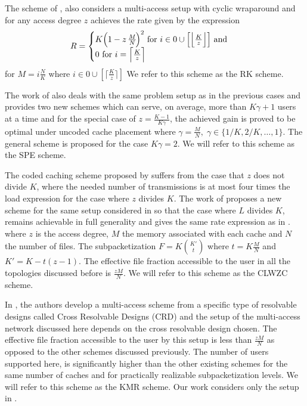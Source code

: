 \documentclass[conference]{IEEEtran}
\begin{document}
	The scheme of \cite{RaK3}, also considers a multi-access setup with cyclic wraparound and for any access degree $z$ achieves the rate given by the expression\\
	\begin{align*}
	R =  
	\begin{cases}
	K \Big{(1-z\;\frac{M}{N}\Big)}^2 \text{ for } i \in {0 \cup \Big[\Bigl\lfloor \frac{K}{z} \Bigr\rfloor\Big]} 
	\text{ and }\\
	 0 \text{ for } i = \Bigl \lceil \frac{K}{z} \Bigr \rceil
	\end{cases}
	\end{align*}
	for $M = i\frac{N}{K}$ where $i \in {0 \cup [\lceil \frac{K}{z} \rceil]}$ 
	We refer to this scheme as the RK scheme.
	
	 The work of \cite{SPE} also deals with the same problem setup as in the previous cases and provides two new schemes which can serve, on average, more than $K\gamma + 1$ users at a time and for the special case of $z = \frac{K-1}{K\gamma}$, the achieved gain is proved to be optimal under uncoded cache placement where $\gamma = \frac{M}{N},\;\gamma \in \{1/K, 2/K,\dots,1\}$. 
	 The general scheme is proposed for the case $K\gamma = 2$.
	 We will refer to this scheme as the SPE scheme.
	 
	 The coded caching scheme proposed by \cite{HKD} suffers
	from the case that $z$ does not divide $K$, where the needed number of transmissions is at most four times the load
	expression for the case where $z$ divides $K$. 
	The work of \cite{CLWZC} proposes a new scheme for the same setup considered in \cite{HKD} so that the
	case where $L$ divides $K$, remains achievable in full generality and gives the same rate expression as in \cite{HKD}. 
	where $z$ is the access degree, $M$ the memory associated with each cache and $N$ the number of files. The subpacketization $F = K \binom{K'}{t}$ where $t = K \frac{M}{N}$ and $K' = K - t(z -1)$.
	The effective file fraction accessible to the user in all the topologies discussed before is $\frac{zM}{N}$.
    We will refer to this scheme as the CLWZC scheme.
    	
	In \cite{KNRarXiv}, the authors develop a multi-access scheme from a specific type of resolvable designs called Cross Resolvable Designs (CRD) and the setup of the multi-access network discussed here depends on the cross resolvable design chosen. The effective file fraction accessible to the user by this setup is less than $\frac{zM}{N}$ as opposed to the other schemes discussed previously.
	The number of users supported here, is significantly higher than the other existing schemes for the same number of caches and for practically realizable subpacketization levels. We will refer to this scheme as the KMR scheme.
	Our work considers only the setup in \cite{KNRarXiv}. 
	
\end{document}
